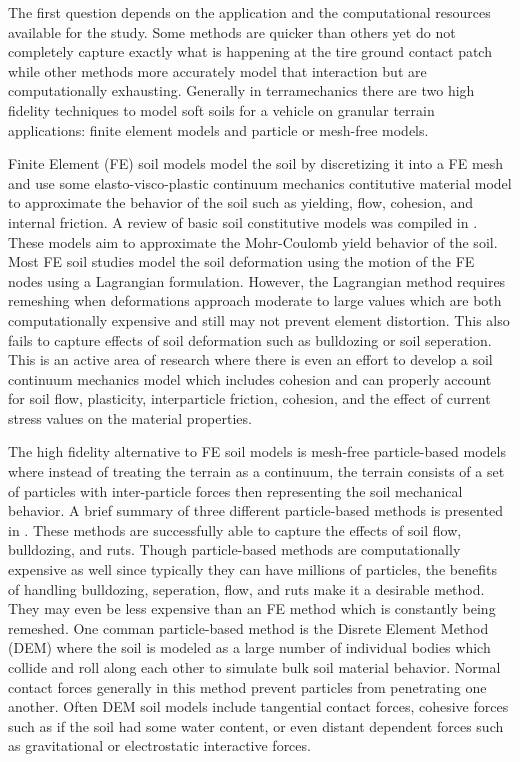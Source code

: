 \documentclass[12pt,onecolumn]{report}
\begin{document}
The first question depends on the application and the computational resources available for the study. Some methods are quicker than others yet do not completely capture exactly what is happening at the tire ground contact patch while other methods more accurately model that interaction but are computationally exhausting. Generally in terramechanics there are two high fidelity techniques to model soft soils for a vehicle on granular terrain applications: finite element models and particle or mesh-free models. 

Finite Element (FE) soil models model the soil by discretizing it into a FE mesh and use some elasto-visco-plastic continuum mechanics contitutive material model to approximate the behavior of the soil such as yielding, flow, cohesion, and internal friction. A review of basic soil constitutive models was compiled in \cite{SoilModels2009}. These models aim to approximate the Mohr-Coulomb yield behavior of the soil. Most FE soil studies model the soil deformation using the motion of the FE nodes using a Lagrangian formulation. However, the Lagrangian method requires remeshing when deformations approach moderate to large values which are both computationally expensive and still may not prevent element distortion. This also fails to capture effects of soil deformation such as bulldozing or soil seperation. This is an active area of research where there is even an effort to develop a soil continuum mechanics model which includes cohesion and can properly account for soil flow, plasticity, interparticle friction, cohesion, and the effect of current stress values on the material properties. 

The high fidelity alternative to FE soil models is mesh-free particle-based models where instead of treating the terrain as a continuum, the terrain consists of a set of particles with inter-particle forces then representing the soil mechanical behavior. A brief summary of three different particle-based methods is presented in \cite{SoilCharacteristics2017}. These methods are successfully able to capture the effects of soil flow, bulldozing, and ruts. Though particle-based methods are computationally expensive as well since typically they can have millions of particles, the benefits of handling bulldozing, seperation, flow, and ruts make it a desirable method. They may even be less expensive than an FE method which is constantly being remeshed. One comman particle-based method is the Disrete Element Method (DEM) where the soil is modeled as a large number of individual bodies which collide and roll along each other to simulate bulk soil material behavior. Normal contact forces generally in this method prevent particles from penetrating one another. Often DEM soil models include tangential contact forces, cohesive forces such as if the soil had some water content, or even distant dependent forces such as gravitational or electrostatic interactive forces. 
\end{document}
